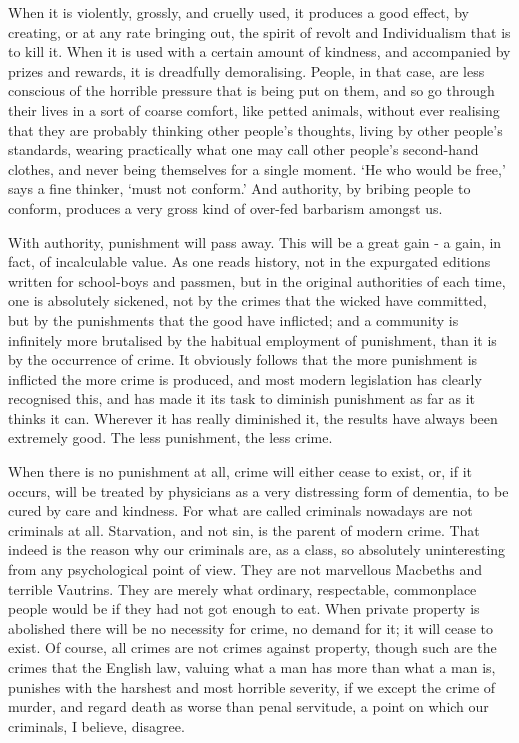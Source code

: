 When it is violently, grossly, and cruelly used, it produces a good effect, by creating, or at any rate bringing out, the spirit of revolt and Individualism that is to kill it. When it is used with a certain amount of kindness, and accompanied by prizes and rewards, it is dreadfully demoralising. People, in that case, are less conscious of the horrible pressure that is being put on them, and so go through their lives in a sort of coarse comfort, like petted animals, without ever realising that they are probably thinking other people’s thoughts, living by other people’s standards, wearing practically what one may call other people’s second-hand clothes, and never being themselves for a single moment. ‘He who would be free,’ says a fine thinker, ‘must not conform.’ And authority, by bribing people to conform, produces a very gross kind of over-fed barbarism amongst us.\par

With authority, punishment will pass away. This will be a great gain - a gain, in fact, of incalculable value. As one reads history, not in the expurgated editions written for school-boys and passmen, but in the original authorities of each time, one is absolutely sickened, not by the crimes that the wicked have committed, but by the punishments that the good have inflicted; and a community is infinitely more brutalised by the habitual employment of punishment, than it is by the occurrence of crime. It obviously follows that the more punishment is inflicted the more crime is produced, and most modern legislation has clearly recognised this, and has made it its task to diminish punishment as far as it thinks it can. Wherever it has really diminished it, the results have always been extremely good. The less punishment, the less crime.\par

When there is no punishment at all, crime will either cease to exist, or, if it occurs, will be treated by physicians as a very distressing form of dementia, to be cured by care and kindness. For what are called criminals nowadays are not criminals at all. Starvation, and not sin, is the parent of modern crime. That indeed is the reason why our criminals are, as a class, so absolutely uninteresting from any psychological point of view. They are not marvellous Macbeths and terrible Vautrins. They are merely what ordinary, respectable, commonplace people would be if they had not got enough to eat. When private property is abolished there will be no necessity for crime, no demand for it; it will cease to exist. Of course, all crimes are not crimes against property, though such are the crimes that the English law, valuing what a man has more than what a man is, punishes with the harshest and most horrible severity, if we except the crime of murder, and regard death as worse than penal servitude, a point on which our criminals, I believe, disagree.\par

